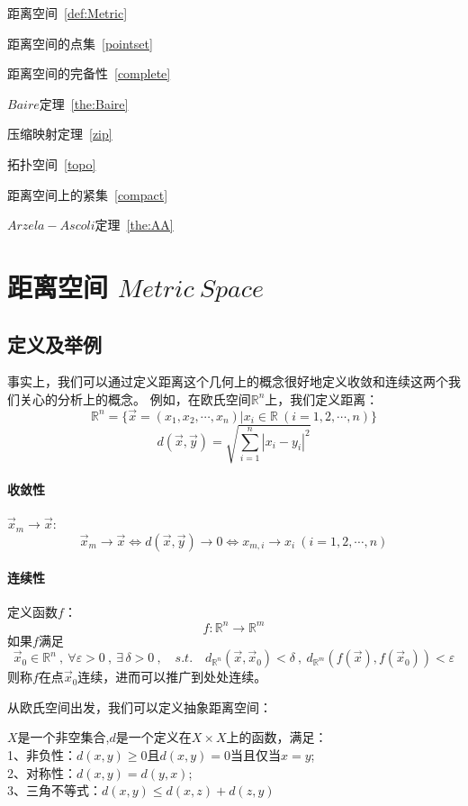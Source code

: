 \begin{introduction}
    \item 距离空间~\ref{def:Metric}
    \item 距离空间的点集~\ref{pointset}
    \item 距离空间的完备性~\ref{complete}
    \item $Baire$定理~\ref{the:Baire}
    \item 压缩映射定理~\ref{zip}
    \item 拓扑空间~\ref{topo}
    \item 距离空间上的紧集~\ref{compact}
    \item $Arzela-Ascoli$定理~\ref{the:AA}
  \end{introduction}
\section{距离空间 $Metric \ Space$}
\subsection{定义及举例}
事实上，我们可以通过定义距离这个几何上的概念很好地定义收敛和连续这两个我们关心的分析上的概念。
例如，在欧氏空间$\mathbb{R}^n$上，我们定义距离：
\[\mathbb{R}^n=\{\overrightarrow{x}=(x_1,x_2,\cdots,x_n)|x_i \in \mathbb{R} \ (i=1,2,\cdots,n)\}\]
\[d(\overrightarrow{x},\overrightarrow{y})=\sqrt{\sum_{i=1}^n\left|x_i-y_i\right|^2}\]
\paragraph*{收敛性} \quad $\overrightarrow{x}_m \rightarrow \overrightarrow{x}$:
\[\overrightarrow{x}_m \rightarrow \overrightarrow{x} \Leftrightarrow d(\overrightarrow{x},\overrightarrow{y}) \rightarrow 0 \Leftrightarrow x_{m,i} \rightarrow x_i \ (i=1,2,\cdots,n)\]
\paragraph*{连续性} \quad 定义函数$f$：
\[f:\mathbb{R}^n \rightarrow \mathbb{R}^m\]
如果$f$满足
\[\overrightarrow{x}_0 \in \mathbb{R}^n\ , \ \forall \varepsilon >0 \ , \ \exists \, \delta >0 \ , \quad s.t. \quad d_{\mathbb{R}^n}(\overrightarrow{x},\overrightarrow{x}_0)<\delta \ , \ d_{\mathbb{R}^m}(f(\overrightarrow{x}),f(\overrightarrow{x}_0))<\varepsilon\]
则称$f$在点$\overrightarrow{x}_0$连续，进而可以推广到处处连续。

从欧氏空间出发，我们可以定义抽象距离空间：
\begin{definition}[抽象距离空间] \label{def:Metric}
    $X$是一个非空集合,$d$是一个定义在$X \times X$上的函数，满足：\\
    1、非负性：$d(x,y) \geq 0$且$d(x,y)=0$当且仅当$x=y$;\\
    2、对称性：$d(x,y)=d(y,x)$;\\
    3、三角不等式：$d(x,y) \leq d(x,z)+d(z,y)$
\end{definition}

